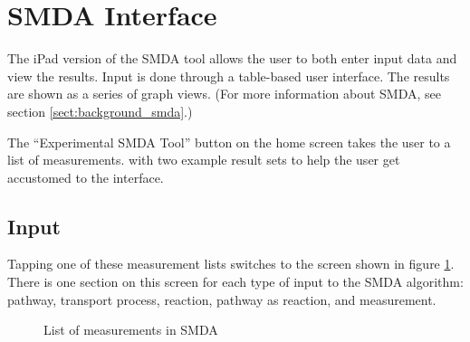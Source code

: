 \section{SMDA Interface}
\label{sect:smda_interface}

The iPad version of the SMDA tool allows the user to both enter input data and
view the results. Input is done through a table-based user interface. The
results are shown as a series of graph views. (For more information about SMDA,
see section \ref{sect:background_smda}.)

The ``Experimental SMDA Tool'' button on the home screen takes the user to a
list of measurements. \mawapp with two example result sets to help the user get
accustomed to the interface.

\subsection{Input}
\label{sect:smda_interface_input}

Tapping one of these measurement lists switches to the screen shown in figure
\ref{fig:screenshot_smda_list}. There is one section on this screen for each
type of input to the SMDA algorithm: pathway, transport process, reaction,
pathway as reaction, and measurement.

\begin{figure}[htb]
    \caption{\label{fig:screenshot_smda_list} List of measurements in SMDA}
\end{figure}

